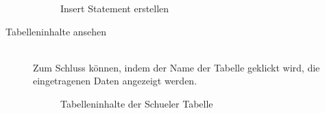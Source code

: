 \begin{description}
\begin{figure}[ht]
        \centering
        \caption{Insert Statement erstellen}
        \label{pic:insert-stat}
\end{figure}

\item[Tabelleninhalte ansehen] \hfill\\
Zum Schluss können, indem der Name der Tabelle geklickt wird, die eingetragenen Daten angezeigt werden.

\begin{figure}[ht]
        \centering
        \caption{Tabelleninhalte der Schueler Tabelle}
        \label{pic:table-details}
\end{figure}

\end{description}

